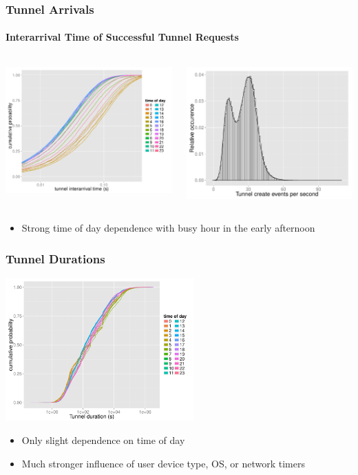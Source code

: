 \documentclass{beamer}
\begin{document}
\begin{frame}
	\frametitle{Tunnel Arrivals}
		\framesubtitle{Interarrival Time of Successful Tunnel Requests}
	\begin{columns}[c]
		\begin{column}{6.5cm}
				\includegraphics[width=6.5cm]{figures/R-IAT-fromflows-ecdfs-2h.pdf}
		\end{column}
		\begin{column}{6.5cm}
			\includegraphics[width=6.5cm]{figures/create_freq.pdf}
		\end{column}
	\end{columns}

	\begin{itemize}
		\item Strong time of day dependence with busy hour in the early afternoon
	\end{itemize}
\end{frame}

\begin{frame}
	\frametitle{Tunnel Durations}
	\begin{center}
		\includegraphics[height=5.5cm]{figures/R-duration-activetunnels-timeofday-ecdf.pdf}
	\end{center}

	\begin{itemize}
		\item Only slight dependence on time of day
		\item Much stronger influence of user device type, OS, or network timers
	\end{itemize}
\end{frame}
\end{document}
